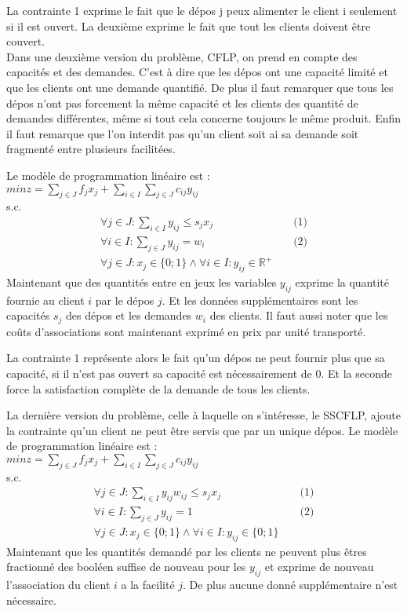 \documentclass[12pt,a4paper]{article}
\begin{document}
La contrainte 1 exprime le fait que le dépos j peux alimenter le client i seulement si il est ouvert. La deuxième exprime le fait que tout les clients doivent être couvert.\\

Dans une deuxième version du problème, CFLP, on prend en compte des capacités et des demandes. C'est à dire que les dépos ont une capacité limité et que les clients ont une demande quantifié. De plus il faut remarquer que tous les dépos n'ont pas forcement la même capacité et les clients des quantité de demandes différentes, même si tout cela concerne toujours le même produit. Enfin il faut remarque que l'on interdit pas qu'un client soit ai sa demande soit fragmenté entre plusieurs facilitées.

Le modèle de programmation linéaire est :\\
$min z = \sum \limits_{j \in J} f_j x_j + \sum \limits_{i \in I} \sum \limits_{j \in J} c_{ij} y_{ij}$\\
s.c.
\begin{align*}
 \forall j \in J : \sum \limits_{i \in I} y_{ij} \leqslant s_j x_j & & \text{ (1)} \\
 \forall i \in I : \sum \limits_{j \in J} y_{ij} = w_i & & \text{ (2)}\\
 \forall j \in J : x_j \in \{0;1\} \land \forall i \in I : y_{ij} \in \mathbb{R}^{+} 
\end{align*}
Maintenant que des quantités entre en jeux les variables $y_{ij}$ exprime la quantité fournie au client $i$ par le dépos $j$. Et les données supplémentaires sont les capacités $s_j$ des dépos et les demandes $w_i$ des clients. Il faut aussi noter que les coûts d'associations sont maintenant exprimé en prix par unité transporté.

La contrainte 1 représente alors le fait qu'un dépos ne peut fournir plus que sa capacité, si il n'est pas ouvert sa capacité est nécessairement de 0. Et la seconde force la satisfaction complète de la demande de tous les clients.

La dernière version du problème, celle à laquelle on s'intéresse, le SSCFLP, ajoute la contrainte qu'un client ne peut être servis que par un unique dépos.
Le modèle de programmation linéaire est :\\
$min z = \sum \limits_{j \in J} f_j x_j + \sum \limits_{i \in I} \sum \limits_{j \in J} c_{ij} y_{ij}$\\
s.c.
\begin{align*}
 \forall j \in J : \sum \limits_{i \in I} y_{ij} w_{ij} \leqslant s_j x_j & & \text{ (1)} \\
 \forall i \in I : \sum \limits_{j \in J} y_{ij} = 1 & & \text{ (2)} \\
 \forall j \in J : x_j \in \{0;1\} \land \forall i \in I : y_{ij} \in \{0;1\}
\end{align*}
Maintenant que les quantités demandé par les clients ne peuvent plus êtres fractionné des booléen suffise de nouveau pour les $y_{ij}$ et exprime de nouveau l'association du client $i$ a la facilité $j$. De plus aucune donné supplémentaire n'est nécessaire.
\end{document}
